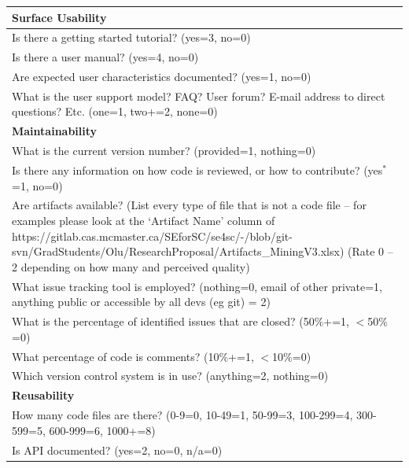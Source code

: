 \documentclass[letterpaper,cleveref]{lipics-v2019}
\begin{document}
\def\arraystretch{1.4}
\begin{tabular}{p{14cm}}
		\hline		
	\textbf{Surface Usability}\\
	\hline
	Is there a getting started tutorial? ({yes=3, no=0})\\
	Is there a user manual? ({yes=4, no=0})\\
	Are expected user characteristics documented? ({yes=1, no=0})\\
	What is the user support model? FAQ? User forum? E-mail address to direct
	questions? Etc. (one=1, two+=2, none=0)\\
	\hline
	\textbf{Maintainability}\\
	\hline
	What is the current version number? (provided=1, nothing=0)\\
	Is there any information on how code is reviewed, or how to contribute?
	({yes$^*$=1, no=0})\\
	Are artifacts available? (List every type of file that is not a code file –
	for examples please look at the ‘Artifact Name’ column of
	https://gitlab.cas.mcmaster.ca/SEforSC/se4sc/-/blob/git-svn/GradStudents/Olu/ResearchProposal/Artifacts\_MiningV3.xlsx)
	(Rate 0 – 2 depending on how many and perceived quality)\\
	What issue tracking tool is employed? (nothing=0, email of other private=1,
	anything public or accessible by all devs (eg git) = 2)\\
	What is the percentage of identified issues that are closed? (50$\%$+=1,
	$<$50$\%$=0)\\
	What percentage of code is comments? (10$\%$+=1, $<$10$\%$=0)\\
	Which version control system is in use? (anything=2, nothing=0)\\
	\hline		
	\textbf{Reusability}\\
	\hline
	How many code files are there? (0-9=0, 10-49=1, 50-99=3, 100-299=4, 300-599=5,
	600-999=6, 1000+=8)\\
	Is API documented? ({yes=2, no=0, n/a=0})\\
	\hline
\end{tabular}
\end{document}

